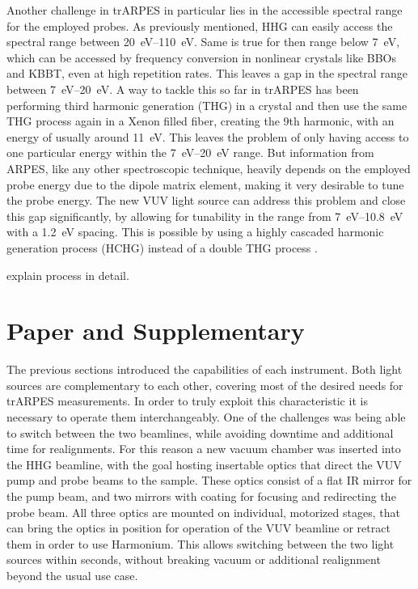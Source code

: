 Another challenge in trARPES in particular lies in the accessible spectral range for the employed probes.
As previously mentioned, HHG can easily access the spectral range between \qtyrange{20}{110}{\electronvolt}.
Same is true for then range below \qty{7}{\electronvolt}, which can be accessed  by frequency conversion in nonlinear crystals like BBOs and KBBT, even at high repetition rates.
This leaves a gap in the spectral range between \qtyrange{7}{20}{\electronvolt}.
A way to tackle this so far in trARPES has been performing third harmonic generation (THG) in a crystal and then use the same THG process again in a Xenon filled fiber, creating the 9th harmonic, with an energy of usually around \qty{11}{\electronvolt}.
This leaves the problem of only having access to one particular energy within the \qtyrange{7}{20}{\electronvolt} range.
But information from ARPES, like any other spectroscopic technique, heavily depends on the employed probe energy due to the dipole matrix element, making it very desirable to tune the probe energy.
The new VUV light source can address this problem and close this gap significantly, by allowing for tunability in the range from \qtyrange{7}{10.8}{\electronvolt} with a \qty{1.2}{\electronvolt} spacing.
This is possible by using a highly cascaded harmonic generation process (HCHG) instead of a double THG process \cite{}.

explain process in detail.




\section{Paper and Supplementary}

The previous sections introduced the capabilities of each instrument.
Both light sources are complementary to each other, covering most of the desired needs for trARPES measurements.
In order to truly exploit this characteristic it is necessary to operate them interchangeably. 
One of the challenges was being able to switch between the two beamlines, while avoiding downtime and additional time for realignments.
For this reason a new vacuum chamber was inserted into the HHG beamline, with the goal hosting insertable optics that direct the VUV pump and probe beams to the sample.
These optics consist of a flat IR mirror for the pump beam, and two  mirrors with  coating for focusing and redirecting the probe beam.
All three optics are mounted on individual, motorized stages, that can bring the optics in position for operation of the VUV beamline or retract them in order to use Harmonium.
This allows switching between the two light sources within seconds, without breaking vacuum or additional realignment beyond the usual use case.



